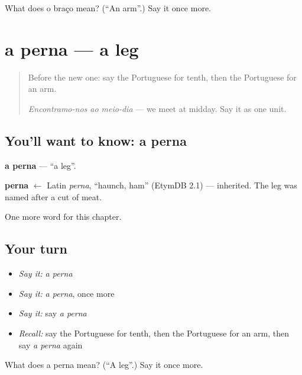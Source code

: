 \begin{tcolorbox}[breakable,colback=teal!4,colframe=teal!35!black,title={Before you move on}]
What does o braço mean? (\textquotedblleft{}An arm\textquotedblright{}.) Say it once more.
\end{tcolorbox}
\section[a perna]{a perna — a leg}

\label{lesson:PT-C30-perna}



\begin{quote}
Before the new one: say the Portuguese for tenth, then the Portuguese for an arm.

\emph{Encontramo-nos ao meio-dia} — we meet at midday. Say it as one unit.
\end{quote}

\subsection*{You'll want to know: a perna}
\textbf{a perna} — \textquotedblleft{}a leg\textquotedblright{}.

\begin{cousinweb}
\textbf{perna} $\leftarrow$ Latin \emph{perna}, \textquotedblleft{}haunch, ham\textquotedblright{} (EtymDB 2.1) — inherited. The leg was named after a cut of meat.
\end{cousinweb}

\begin{grammarlens}[title={What you've built}]
One more word for this chapter.
\end{grammarlens}

\subsection*{Your turn}
\begin{itemize}
\raggedright
  \item \emph{Say it:} \emph{a perna}
  \item \emph{Say it:} \emph{a perna}, once more
  \item \emph{Say it:} say \emph{a perna}
  \item \emph{Recall:} say the Portuguese for tenth, then the Portuguese for an arm, then say \emph{a perna} again
\end{itemize}

\begin{tcolorbox}[breakable,colback=teal!4,colframe=teal!35!black,title={Before you move on}]
What does a perna mean? (\textquotedblleft{}A leg\textquotedblright{}.) Say it once more.
\end{tcolorbox}
